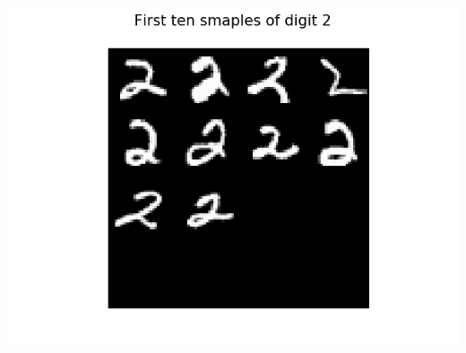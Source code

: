\documentclass{article}
\begin{document}
\begin{center}
    \includegraphics[trim=3cm 0 3cm 0, scale=0.4]{images/task1_1_imgs_class2.png}
\end{center}
    \\
\end{document}
